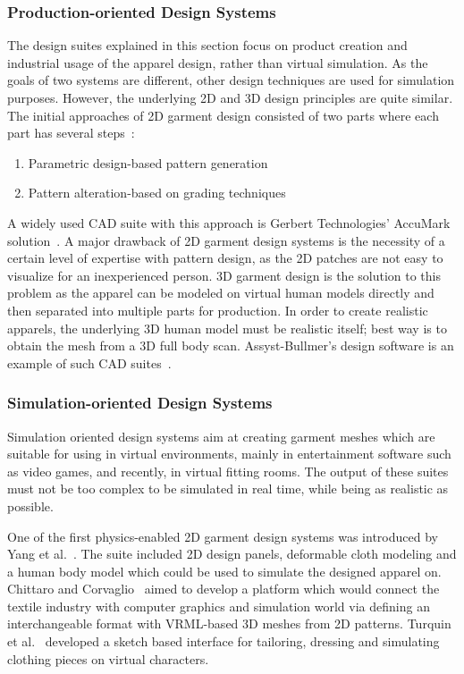 \subsubsection{Production-oriented Design Systems}

The design suites explained in this section focus on product creation and industrial usage of the apparel design, rather than virtual simulation. As the goals of two systems are different, other design techniques are used for simulation purposes. However, the underlying 2D and 3D design principles are quite similar. The initial approaches of 2D garment design consisted of two parts where each part has several steps~\cite{Yang2007}:  
 
\begin{enumerate}
\item Parametric design-based pattern generation
\item Pattern alteration-based on grading techniques
\end{enumerate}    
 
A widely used CAD suite with this approach is Gerbert Technologies' AccuMark solution~\cite{Gerbert2013}. A major drawback of 2D garment design systems is the necessity of a certain level of expertise with pattern design, as the 2D patches are not easy to visualize for an inexperienced person. 3D garment design is the solution to this problem as the apparel can be modeled on virtual human models directly and then separated 
into multiple parts for production. In order to create realistic apparels, the underlying 3D human model must be realistic itself; best way is to obtain the mesh from a 3D full body scan. Assyst-Bullmer's design software is an example of such CAD suites~\cite{Assyst2013}. 
 
\subsubsection{Simulation-oriented Design Systems} 
 
Simulation oriented design systems aim at creating garment meshes which are suitable for using in virtual environments, mainly in entertainment software such as video games, and recently, in virtual fitting rooms. The output of these suites must not be too complex to be simulated in real time, while being as realistic as possible.
 
One of the first physics-enabled 2D garment design systems was introduced by Yang et al.~\cite{Yang1992}. The suite included 2D design panels, deformable cloth modeling and a human body model which could be used to simulate the designed apparel on. Chittaro and Corvaglio~\cite{Chittaro2003} aimed to develop a platform which would connect the textile industry with computer graphics and simulation world via defining an interchangeable format with VRML-based 3D meshes from 2D patterns. Turquin et al.~\cite{Turquin2007} developed a sketch based interface for tailoring, dressing and simulating clothing pieces on virtual characters.
 
